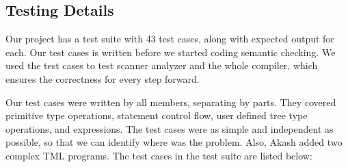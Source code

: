 \documentclass[12pt,psfig,a4]{article}
\begin{document}
\subsection{Testing Details}
Our project has a test suite with 43 test cases, along with expected output for each. Our test cases is written before we started coding semantic checking. We used the test cases to test scanner analyzer and the whole compiler, which ensures the correctness for every step forward. 

Our test cases were written by all members, separating by parts. They covered primitive type operations, statement control flow, user defined tree type operations, and expressions. The test cases were as simple and independent as possible, so that we can identify where was the problem. Also, Akash added two complex TML programs. The test cases in the test suite are listed below:
\end{document}
